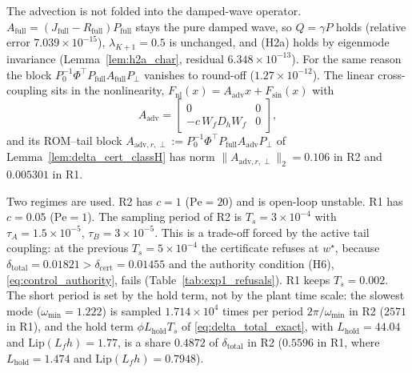 The advection is not folded into the damped-wave operator. \(A_{\mathrm{full}} = (J_{\mathrm{full}} - R_{\mathrm{full}})P_{\mathrm{full}}\)
stays the pure damped wave, so \(Q = \gamma P\) holds (relative error \(7.039\times10^{-15}\)), \(\lambda_{K+1} = 0.5\)
is unchanged, and (H2a) holds by eigenmode invariance (Lemma~\ref{lem:h2a_char}, residual \(6.348\times10^{-13}\)). For
the same reason the block \(P_0^{-1}\Phi^\top P_{\mathrm{full}}A_{\mathrm{full}}P_\perp\) vanishes to round-off
(\(1.27\times10^{-12}\)). The linear cross-coupling sits in the nonlinearity,
\(F_{\mathrm{nl}}(x) = A_{\mathrm{adv}}x + F_{\sin}(x)\) with
\[
A_{\mathrm{adv}} = \begin{bmatrix}0&0\\-c\,W_fD_hW_f&0\end{bmatrix},
\]
and its ROM--tail block \(A_{\mathrm{adv},r,\perp} := P_0^{-1}\Phi^\top P_{\mathrm{full}}A_{\mathrm{adv}}P_\perp\) of
Lemma~\ref{lem:delta_cert_classH} has norm \(\|A_{\mathrm{adv},r,\perp}\|_2 = 0.106\) in R2 and
\(0.005301\) in R1.

Two regimes are used. R2 has \(c = 1\) (\(\mathrm{Pe} = 20\)) and is open-loop unstable. R1 has
\(c = 0.05\) (\(\mathrm{Pe} = 1\)). The sampling period of R2 is \(T_s = 3\times10^{-4}\) with
\(\tau_A = 1.5\times10^{-5}\), \(\tau_B = 3\times10^{-5}\). This is a trade-off forced by the active tail coupling: at the
previous \(T_s = 5\times10^{-4}\) the certificate refuses at \(w^\star\), because
\(\delta_{\mathrm{total}} = 0.01821 > \delta_{\mathrm{cert}} = 0.01455\) and
the authority condition (H6), \eqref{eq:control_authority}, fails (Table~\ref{tab:exp1_refusals}). R1 keeps \(T_s = 0.002\).
The short period is set by the hold term, not by the plant time scale: the slowest mode (\(\omega_{\min} = 1.222\))
is sampled \(1.714\times10^{4}\) times per period \(2\pi/\omega_{\min}\) in R2 (\(2571\) in R1),
and the hold term \(\phi L_{\mathrm{hold}}T_s\) of \eqref{eq:delta_total_exact}, with \(L_{\mathrm{hold}} = 44.04\)
and \(\mathrm{Lip}(L_fh) = 1.77\), is a share \(0.4872\) of \(\delta_{\mathrm{total}}\) in R2
(\(0.5596\) in R1, where \(L_{\mathrm{hold}} = 1.474\) and \(\mathrm{Lip}(L_fh) = 0.7948\)).

